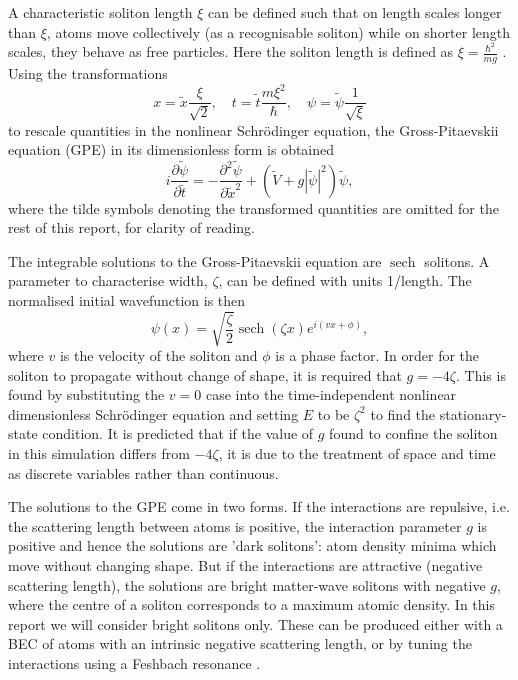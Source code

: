 \documentclass[10pt, twocolumn]{revtex4}    %
\DeclareMathOperator{\sech}{sech}		%
\begin{document}
A characteristic soliton length $\xi$ can be defined such that on length scales longer than $\xi$, atoms move collectively (as a recognisable soliton) while on shorter length scales, they behave as free particles. Here the soliton length is defined as $\xi = \frac{\hbar^2}{mg}$ \cite{Cornish}. Using the transformations \cite{Transforms} 
\begin{equation} \label{transforms}
x = \tilde{x} \frac{\xi}{\sqrt{2}}, \quad		 t = \tilde{t} \frac{m \xi^2}{\hbar}, 	\quad \psi = \tilde{\psi} \frac{1}{\sqrt{\xi}}
\end{equation}
to rescale quantities in the nonlinear Schr\"{o}dinger equation, the Gross-Pitaevskii equation (GPE) in its dimensionless form is obtained \cite{Gross} \cite{Pitaevskii}
\begin{equation} \label{GPE}
i \frac{\partial \tilde{\psi}}{\partial \tilde{t}} = -\frac{\partial^2 \tilde{\psi}}{\partial \tilde{x}^2} + (\tilde{V}+g |\tilde{\psi}|^2) \tilde{\psi},
\end{equation}
where the tilde symbols denoting the transformed quantities are omitted for the rest of this report, for clarity of reading. 

The integrable solutions to the Gross-Pitaevskii equation are $\sech$ solitons. A parameter to characterise width, $\zeta$, can be defined with units 1/length. The normalised initial wavefunction is then 
\begin{equation} \label{soliton}
\psi(x) = \sqrt{\frac{\zeta}{2}} \sech{(\zeta x)} e^{i (v x + \phi)},
\end{equation}
where $v$ is the velocity of the soliton and $\phi$ is a phase factor. In order for the soliton to propagate without change of shape, it is required that $g=-4\zeta$. This is found by substituting the $v=0$ case into the time-independent nonlinear dimensionless Schr\"{o}dinger equation and setting $E$ to be $\zeta^2$ to find the stationary-state condition. It is predicted that if the value of $g$ found to confine the soliton in this simulation differs from $-4\zeta$, it is due to the treatment of space and time as discrete variables rather than continuous. 

The solutions to the GPE come in two forms. If the interactions are repulsive, i.e. the scattering length between atoms is positive, the interaction parameter $g$ is positive and hence the solutions are 'dark solitons': atom density minima which move without changing shape. But if the interactions are attractive (negative scattering length), the solutions are bright matter-wave solitons with negative $g$, where the centre of a soliton corresponds to a maximum atomic density. In this report we will consider bright solitons only. These can be produced either with a BEC of atoms with an intrinsic negative scattering length, or by tuning the interactions using a Feshbach resonance \cite{Feshbach}. 
\end{document}

